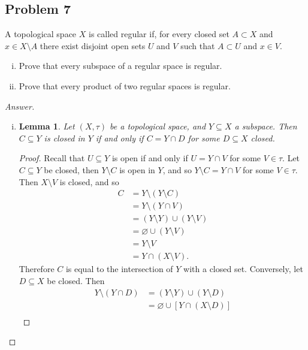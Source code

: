 \documentclass[12pt]{article}
\newcommand\paren[1]{\left( #1 \right)}
\newcommand{\sqbrack}[1]{\left [ #1 \right ]}
\newtheorem{lemma}[theorem]{Lemma}
\theoremstyle{definition}
\begin{document}
\subsection{Problem 7 \texorpdfstring{\cite{Munkres}}{}}
A topological space $X$ is called regular if, for every closed set $A \subset X$ and $x \in X \setminus A$ there exist disjoint open sets $U$ and $V$ such that $A \subset U$ and $x \in V$.
\begin{enumerate}[(i)]
    \item Prove that every subspace of a regular space is regular.
    \item Prove that every product of two regular spaces is regular.
\end{enumerate}
\begin{proof}[Answer]
    \noindent
    \begin{enumerate}[(i)]
        \item 
        \begin{lemma}
            Let $(X,\tau)$ be a topological space, and $Y \subseteq X$ a subspace. Then $C \subseteq Y$ is closed in $Y$ if and only if $C = Y \cap D$ for some $D \subseteq X$ closed.
        \end{lemma}
        \begin{proof}
            Recall that $U \subseteq Y$ is open if and only if $U = Y \cap V$ for some $V \in \tau$. Let $C \subseteq Y$ be closed, then $Y \setminus C$ is open in $Y$, and so $Y \setminus C = Y \cap V$ for some $V \in \tau$. Then $X \setminus V$ is closed, and so 
            \begin{align*}
                C & = Y \setminus \paren{ Y \setminus C } \\
                & = Y \setminus \paren{ Y \cap V } \\
                & = \paren{ Y \setminus Y } \cup \paren{ Y \setminus V } \\
                & = \varnothing \cup \paren{ Y \setminus V } \\
                & = Y \setminus V \\
                & = Y \cap \paren{ X \setminus V }.
            \end{align*}
            Therefore $C$ is equal to the intersection of $Y$ with a closed set. Conversely, let $D \subseteq X$ be closed. Then 
            \begin{align*}
                Y \setminus \paren{ Y \cap D } & = \paren{ Y \setminus Y } \cup \paren{ Y \setminus D } \\
                & = \varnothing \cup \sqbrack{ Y \cap \paren{ X \setminus D } } \\

\end{align*}
\end{proof}
\end{enumerate}
\end{proof}
\end{document}
